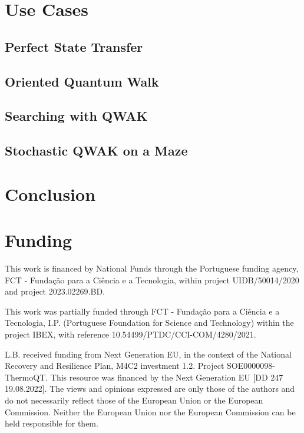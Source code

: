 \documentclass[preprint,12pt]{elsarticle}
\begin{document}
\section{Use Cases}\label{sec:use_cases}
    
    \subsection{Perfect State Transfer}
        
    \subsection{Oriented Quantum Walk}
        
    \subsection{Searching with QWAK}
        
    \subsection{Stochastic QWAK on a Maze}
        


\section{Conclusion}\label{sec:conclusion}
    

\clearpage

\section*{Funding}
This work is financed by National Funds through the Portuguese funding agency,
FCT - Fundação para a Ciência e a Tecnologia, within project UIDB/50014/2020 and project 2023.02269.BD. 

This work was partially funded  through FCT - Fundação para a Ciência e a Tecnologia, I.P. (Portuguese Foundation for Science and Technology) within the project IBEX, with reference 10.54499/PTDC/CCI-COM/4280/2021.

\sloppy
L.B. received funding from Next Generation EU, in the context of the National
Recovery and Resilience Plan, M4C2 investment 1.2. Project SOE0000098-ThermoQT. This resource was financed by the Next Generation EU [DD 247 19.08.2022]. The
views and opinions expressed are only those of the authors and do not
necessarily reflect those of the European Union or the European Commission.
Neither the European Union nor the European Commission can be held responsible
for them.
\end{document}
